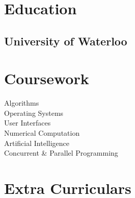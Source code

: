 \documentclass[letterpaper]{kevin-resume} %
\begin{document}
{\begin{minipage}[t]{0.30\textwidth}
\section{Education} 

\subsection{University of Waterloo}


\sectionspace %


\section{Coursework}

Algorithms \\
Operating Systems \\
User Interfaces \\
Numerical Computation \\
Artificial Intelligence \\
Concurrent \& Parallel Programming

\sectionspace %



\section{Extra Curriculars}

\end{minipage}}
\end{document}
